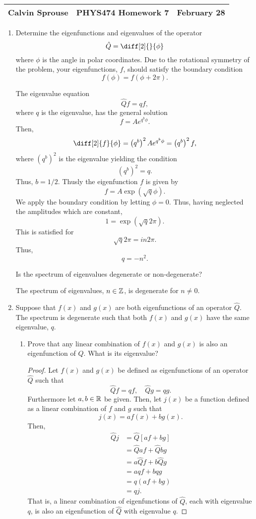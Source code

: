 \documentclass[a4paper, 12pt]{config/homework}
\begin{document}
\noindent
\begin{tabularx}{\textwidth}{>{\centering\arraybackslash}X>{\centering\arraybackslash}X>{\centering\arraybackslash}X}
Calvin Sprouse & PHYS474 Homework 7 & 2024 February 28\\
\midrule
\end{tabularx}

\begin{enumerate}
\item Determine the eigenfunctions and eigenvalues of the operator
\[\hat{Q} = \diff[2]{}{\phi}\]
where \(\phi \) is the angle in polar coordinates. Due to the rotational symmetry of the problem, your eigenfunctions, \(f\), should satisfy the boundary condition
\[f(\phi) = f(\phi + 2\pi).\]

The eigenvalue equation
\[\hat{Q}f = qf,\]
where \(q\) is the eigenvalue, has the general solution
\[f=Ae^{q^b \phi}.\]
Then,
\[\diff[2]{f}{\phi} = \left(q^b\right)^2 Ae^{q^b \phi} = \left(q^b\right)^2 f,\]
where \(\left(q^b\right)^2\) is the eigenvalue yielding the condition
\[\left(q^b\right)^2 = q.\]
Thus, \(b=1/2\). Thusly the eigenfunction \(f\) is given by
\[f = A\exp\left(\sqrt{q}\phi\right).\]
We apply the boundary condition by letting \(\phi=0\). Thus, having neglected the amplitudes which are constant,
\[1 = \exp\left(\sqrt{q}2\pi\right).\]
This is satisfied for
\[\sqrt{q}2\pi = in 2\pi.\]
Thus,
\[q = -n^2.\]

Is the spectrum of eigenvalues degenerate or non-degenerate?

The spectrum of eigenvalues, \(n\in\mathbb{Z} \), is degenerate for \(n\ne 0\).

\pagebreak
\item Suppose that \(f(x)\) and \(g(x)\) are both eigenfunctions of an operator \(\hat{Q}\). The spectrum is degenerate such that both \(f(x)\) and \(g(x)\) have the same eigenvalue, \(q\).
\begin{enumerate}[label=(\alph*.)]
\item  Prove that any linear combination of \(f(x)\) and \(g(x)\) is also an eigenfunction of \(Q\). What is its eigenvalue?

\begin{proof}
Let \(f(x)\) and \(g(x)\) be defined as eigenfunctions of an operator \(\hat{Q}\) such that
\[\hat{Q}f=qf, \quad \hat{Q}g = qg.\]
Furthermore let \(a,b\in\mathbb{R} \) be given. Then, let \(j(x)\) be a function defined as a linear combination of \(f\) and \(g\) such that
\[j(x) = af(x) + bg(x).\]
Then,
\begin{align*}
\hat{Q}j &= \hat{Q}\left[af + bg\right] \\
&= \hat{Q}af + \hat{Q}bg \\
&= a\hat{Q}f + b\hat{Q}g \\
&= aqf + bqg \\
&= q\left(af + bg\right) \\
&= qj.
\end{align*}
That is, a linear combination of eigenfunctions of \(\hat{Q}\), each with eigenvalue \(q\), is also an eigenfunction of \(\hat{Q}\) with eigenvalue \(q\).
\end{proof}


\end{enumerate}
\end{enumerate}
\end{document}
